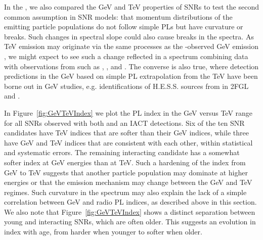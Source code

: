 In the \snrcat{}, we also compared the GeV and TeV properties of SNRs to test the second common assumption in SNR models: that momentum distributions of the emitting particle populations do not follow simple PLs but have curvature or breaks. Such changes in spectral slope could also cause breaks in the \gam{} spectra. As TeV emission may originate via the same processes as the \FermiLat-observed GeV emission \citep[e.g.][]{Funk08_GeVTeVGalactic, Tibolla09_HESSUnIds, Tam10_VHEforFermi}, we might expect to see such a change reflected in a spectrum combining \FermiLat{} data with observations from \iacts{} such as \hess{}, \veritas{}, and \magic{}. The converse is also true, where detection predictions in the GeV based on simple PL extrapolation from the TeV have been borne out in GeV studies, e.g. identifications of H.E.S.S. sources from \cite{Tibolla09_HESSUnIds} in 2FGL \citep{2FGL} and \cite{Ackermann12_1FGLUnassoc}. 

In Figure~\ref{fig:GeVTeVIndex} we plot the PL index in the GeV versus TeV range for all SNRs observed with both \FermiLat{} and an IACT detections. Six of the ten SNR candidates have TeV indices that are softer than their GeV indices, while three have GeV and TeV indices that are consistent with each other, within statistical and systematic errors. The remaining interacting candidate has a somewhat softer index at GeV energies than at TeV. Such a hardening of the index from GeV to TeV suggests that another particle population may dominate at higher energies or that the emission mechanism may change between the GeV and TeV regimes. Such curvature in the spectrum may also explain the lack of a simple correlation between GeV and radio PL indices, as described above in this section. We also note that Figure~\ref{fig:GeVTeVIndex} shows a distinct separation between young and interacting SNRs, which are often older. This suggests an evolution in index with age, from harder when younger to softer when older. 

